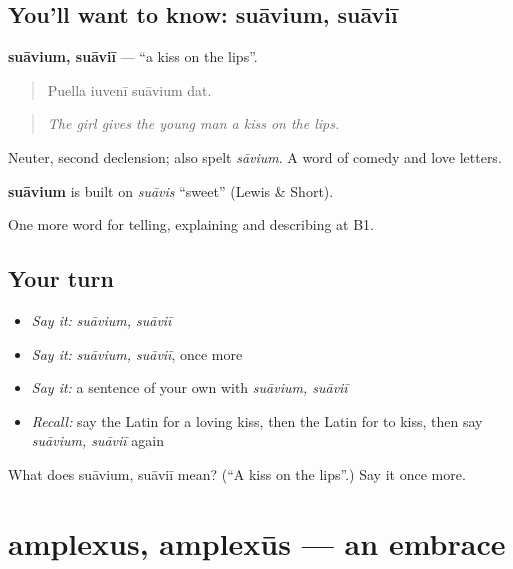 \subsection*{You'll want to know: suāvium, suāviī}
\textbf{suāvium, suāviī} — \textquotedblleft{}a kiss on the lips\textquotedblright{}.

\begin{quote}
Puella iuvenī suāvium dat.
\end{quote}

\begin{quote}
\emph{The girl gives the young man a kiss on the lips.}
\end{quote}

Neuter, second declension; also spelt \emph{sāvium}. A word of comedy and love letters.

\begin{cousinweb}
\textbf{suāvium} is built on \emph{suāvis} \textquotedblleft{}sweet\textquotedblright{} (Lewis \& Short).
\end{cousinweb}

\begin{grammarlens}[title={What you've built}]
One more word for telling, explaining and describing at B1.
\end{grammarlens}

\subsection*{Your turn}
\begin{itemize}
\raggedright
  \item \emph{Say it:} \emph{suāvium, suāviī}
  \item \emph{Say it:} \emph{suāvium, suāviī}, once more
  \item \emph{Say it:} a sentence of your own with \emph{suāvium, suāviī}
  \item \emph{Recall:} say the Latin for a loving kiss, then the Latin for to kiss, then say \emph{suāvium, suāviī} again
\end{itemize}

\begin{tcolorbox}[breakable,colback=teal!4,colframe=teal!35!black,title={Before you move on}]
What does suāvium, suāviī mean? (\textquotedblleft{}A kiss on the lips\textquotedblright{}.) Say it once more.
\end{tcolorbox}
\section[amplexus, amplexūs]{amplexus, amplexūs — an embrace}

